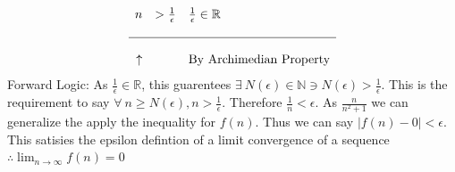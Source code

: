\documentclass[11pt]{article}
\theoremstyle{plain}
\begin{document}
\begin{minipage}{\textwidth}
\[\begin{array}{rll}
			n                                  & > \frac{1}{\epsilon} & \frac{1}{\epsilon} \in \mathbb{R}                                      \\ \\
			\hline                                                                                                                             \\
			\uparrow                           &                      & \text{By Archimedian Property}
		\end{array}
	\]
	Forward Logic: As $\frac{1}{\epsilon} \in \mathbb{R}$, this guarentees $\exists ~N(\epsilon) \in \mathbb{N} \ni N(\epsilon) > \frac{1}{\epsilon}$. This is the requirement to say $\forall ~n \geq  N(\epsilon), n > \frac{1}{\epsilon}$. Therefore $\frac{1}{n} < \epsilon$. As $\frac{n}{n^2+1}$ we can generalize the apply the inequality for $f(n)$. Thus we can say $|f(n) - 0| < \epsilon$. This satisies the epsilon defintion of a limit convergence of a sequence $\therefore \lim_{n \to \infty} f(n) = 0$
\end{minipage}
\end{document}
